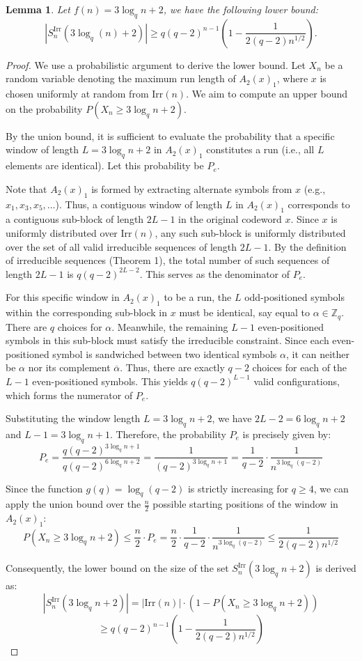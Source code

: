 \documentclass[pdflatex,sn-mathphys-num]{sn-jnl}
\theoremstyle{theorem}%
\newtheorem{lemma}{Lemma}
\theoremstyle{definition}
\theoremstyle{construction}
\newtheorem{open problem}{Open problem}
\begin{document}
\begin{lemma} Let $f(n)=3\log_{q}n+2$, we have the following lower bound:
	$$\left | S^{\mathrm{Irr}}_{n}(3\log_{q}(n)+2) \right | \ge q(q-2)^{n-1} \left(1-\frac{1}{2(q-2)n^{1/2}}\right).$$
\end{lemma}
\begin{proof}
	We use a probabilistic argument to derive the lower bound. Let $X_n$ be a random variable denoting the maximum run length of $A_2(x)_1$, where $x$ is chosen uniformly at random from $\mathrm{Irr}(n)$. We aim to compute an upper bound on the probability $P(X_n \ge 3\log_q n + 2)$.
	
	By the union bound, it is sufficient to evaluate the probability that a specific window of length $L = 3\log_q n + 2$ in $A_2(x)_1$ constitutes a run (i.e., all $L$ elements are identical). Let this probability be $P_e$.
	
	Note that $A_2(x)_1$ is formed by extracting alternate symbols from $x$ (e.g., $x_1, x_3, x_5, \dots$). Thus, a contiguous window of length $L$ in $A_2(x)_1$ corresponds to a contiguous sub-block of length $2L - 1$ in the original codeword $x$. Since $x$ is uniformly distributed over $\mathrm{Irr}(n)$, any such sub-block is uniformly distributed over the set of all valid irreducible sequences of length $2L - 1$. By the definition of irreducible sequences (Theorem 1), the total number of such sequences of length $2L - 1$ is $q(q-2)^{2L-2}$. This serves as the denominator of $P_e$.
	
	For this specific window in $A_2(x)_1$ to be a run, the $L$ odd-positioned symbols within the corresponding sub-block in $x$ must be identical, say equal to $\alpha \in \mathbb{Z}_q$. There are $q$ choices for $\alpha$. Meanwhile, the remaining $L-1$ even-positioned symbols in this sub-block must satisfy the irreducible constraint. Since each even-positioned symbol is sandwiched between two identical symbols $\alpha$, it can neither be $\alpha$ nor its complement $\overline{\alpha}$. Thus, there are exactly $q-2$ choices for each of the $L-1$ even-positioned symbols. This yields $q(q-2)^{L-1}$ valid configurations, which forms the numerator of $P_e$.
	
	Substituting the window length $L = 3\log_q n + 2$, we have $2L - 2 = 6\log_q n + 2$ and $L - 1 = 3\log_q n + 1$. Therefore, the probability $P_e$ is precisely given by:
	$$P_e = \frac{q(q-2)^{3\log_q n + 1}}{q(q-2)^{6\log_q n + 2}} = \frac{1}{(q-2)^{3\log_q n + 1}} = \frac{1}{q-2}\cdot\frac{1}{n^{3\log_q(q-2)}}$$
	
	Since the function $g(q) = \log_q(q-2)$ is strictly increasing for $q \ge 4$, we can apply the union bound over the $\frac{n}{2}$ possible starting positions of the window in $A_2(x)_1$:
	$$P(X_n \ge 3\log_q n + 2) \le \frac{n}{2} \cdot P_e = \frac{n}{2}\cdot\frac{1}{q-2}\cdot\frac{1}{n^{3\log_q(q-2)}} \le \frac{1}{2(q-2)n^{1/2}}$$
	
	Consequently, the lower bound on the size of the set $S_n^{\mathrm{Irr}}(3\log_q n + 2)$ is derived as:
	$$|S_n^{\mathrm{Irr}}(3\log_q n + 2)| = |\mathrm{Irr}(n)| \cdot (1 - P(X_n \ge 3\log_q n + 2))$$
	$$\ge q(q-2)^{n-1} \left(1 - \frac{1}{2(q-2)n^{1/2}}\right)$$
\end{proof}
\end{document}
